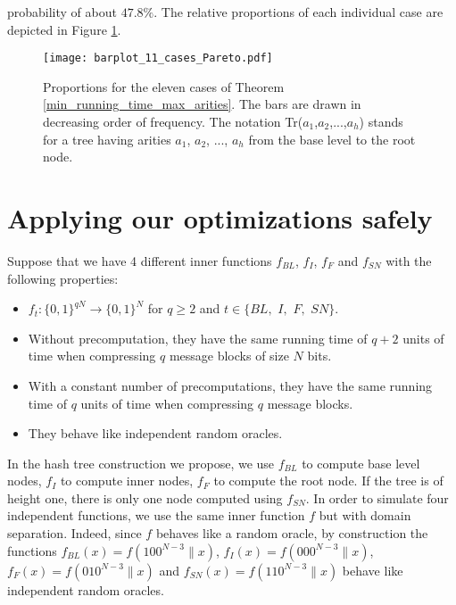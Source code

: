 \documentclass{llncs}
\begin{document}
probability of about $47.8\%$.
The relative proportions of each individual case are depicted in Figure \ref{barplot_11_cases}.
\begin{figure}[h]
 \centering
 \texttt{[image: barplot\_11\_cases\_Pareto.pdf]}
 \caption{Proportions for the eleven cases of Theorem \ref{min_running_time_max_arities}. The bars are drawn in decreasing order of frequency.
 The notation Tr($a_1$,$a_2$,...,$a_h$) stands for a tree having arities $a_1$, $a_2$, ..., $a_h$ from the base level to the root node.}
 \label{barplot_11_cases}
\end{figure}


























\section{Applying our optimizations safely}\label{sec_section2}

Suppose that we have 4 different inner functions $f_{BL}$, $f_{I}$, $f_{F}$ and $f_{SN}$ with the following properties:
\begin{itemize}
 \item $f_{t} : \{0,1\}^{qN} \rightarrow \{0,1\}^N$ for $q \geq 2$ and $t \in \{BL,$ $I,$ $F,$ $SN\}$.
 \item Without precomputation, they have the same running time of $q+2$ units of
time when compressing $q$ message blocks of size $N$ bits.
  \item With a constant number of precomputations, they have the same running time of $q$ units of time when
  compressing $q$ message blocks.
\item They behave like independent random oracles.
\end{itemize}
In the hash tree construction we propose, we use $f_{BL}$ to compute base level nodes, $f_{I}$ to compute inner nodes, $f_{F}$
to compute the root node. If the tree is of height one, there is only one node computed using $f_{SN}$. In order
to simulate four independent functions, we use the same inner function $f$ but with domain separation. Indeed, since $f$ behaves like a random oracle,
by construction the functions $f_{BL}(x) = f(100^{N-3} \| x)$, $f_{I}(x) = f(000^{N-3} \| x)$, $f_{F}(x) = f(010^{N-3} \| x)$ and  $f_{SN}(x) = f(110^{N-3} \| x)$
behave like independent random oracles.
~\\
\end{document}
